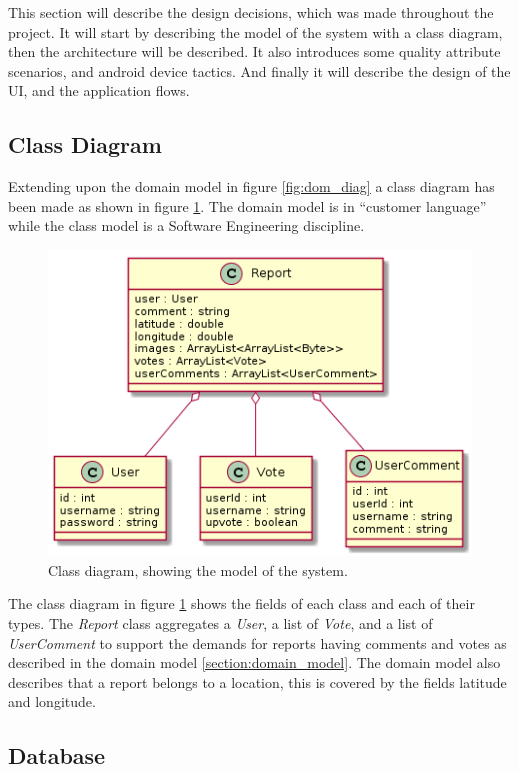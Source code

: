 
This section will describe the design decisions, which was made throughout the project. It will start by describing the model of the system with a class diagram, then the architecture will be described. It also introduces some quality attribute scenarios, and android device tactics. And finally it will describe the design of the UI, and the application flows.


\subsection{Class Diagram}
Extending upon the  domain model in figure \ref{fig:dom_diag} a class diagram has been made as shown in figure \ref{fig:class_diagram}. The domain model is in “customer language” while the class model is a Software Engineering discipline. 

\begin{figure}[hbt]
\centering
\includegraphics[width=.6\textwidth]{images/Class_model_diagram}
\caption{Class diagram, showing the model of the system.} \label{fig:class_diagram}
\end{figure}

The class diagram in figure \ref{fig:class_diagram} shows the fields of each class and each of their types. The \textit{Report} class aggregates a \textit{User}, a list of \textit{Vote}, and a list of \textit{UserComment} to support the demands for reports having comments and votes as described in the domain model \ref{section:domain_model}. The domain model also describes that a report belongs to a location, this is covered by the fields latitude and longitude. 

\subsection{Database}

